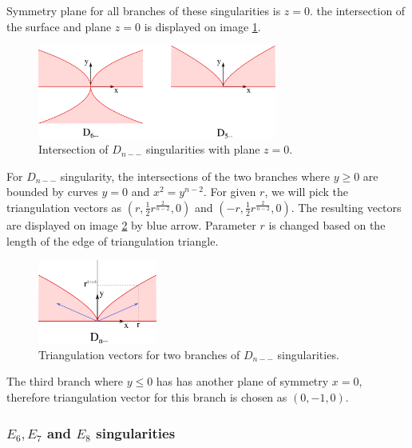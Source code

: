 Symmetry plane for all branches of these singularities is $z=0$.
the intersection of the surface and plane $z=0$ is displayed on image \ref{img:6}.

\begin{figure}
    \centerline{\includegraphics[width=0.7\textwidth]{images/img6}}
    \caption[Intersection of $D_{n--}$ singularities with plane $z=0$.]
    {Intersection of $D_{n--}$ singularities with plane $z=0$.}
    \label{img:6}
\end{figure}

For $D_{n--}$ singularity, the intersections of the two branches where
$y \geq 0$ are bounded by curves $y=0$ and $x^2=y^{n-2}$. For given $r$,
we will pick the triangulation vectors as $(r, \frac{1}{2}r^{\frac{2}{n-2}}, 0)$
and $(-r, \frac{1}{2}r^{\frac{2}{n-2}}, 0)$. The resulting vectors are
displayed on image \ref{img:9} by blue arrow. Parameter $r$ is changed based
on the length of the edge of triangulation triangle.

\begin{figure}
    \centerline{\includegraphics[width=0.35\textwidth]{images/img9}}
    \caption[Triangulation vectors for two branches of $D_{n--}$ singularities.]
    {Triangulation vectors for two branches of $D_{n--}$ singularities.}
    \label{img:9}
\end{figure}

The third branch where $y\leq0$ has has another plane of symmetry $x=0$,
therefore triangulation vector for this branch is chosen as $(0, -1, 0)$.

\subsubsection*{$E_6, E_7$ and $E_8$ singularities}

